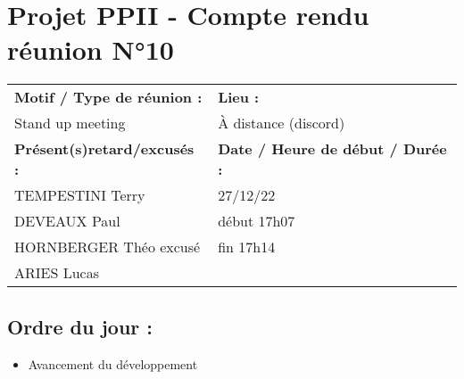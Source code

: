 \documentclass{article}
\begin{document}
\section*{Projet PPII - Compte rendu réunion N°10}
\begin{tabular}{|p{7cm}|p{6cm}|}
    \hline
    \textbf{Motif / Type de réunion :}
    & \textbf{Lieu :}
    \\
    Stand up meeting
    & 
    À distance (discord)
    \\ \hline
    \textbf{Présent(s)retard/excusés :}
    &
    \textbf{Date / Heure de début / Durée :}
    \\ 
    TEMPESTINI Terry &  27/12/22\\  
    DEVEAUX Paul & début 17h07\\
    HORNBERGER Théo excusé & fin 17h14\\
    ARIES Lucas & 
    \\ \hline
\end{tabular}

\subsection*{Ordre du jour :}
\begin{itemize}
    \item{Avancement du développement}
\end{itemize}
\end{document}
